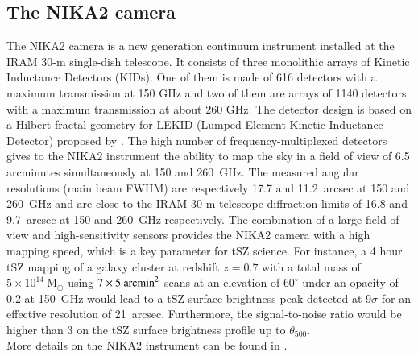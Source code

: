 \documentclass[traditabstract]{aa}
\begin{document}
\subsection{The NIKA2 camera}
The NIKA2 camera is a new generation continuum instrument installed at the IRAM 30-m single-dish telescope. It consists of three monolithic arrays of Kinetic Inductance Detectors (KIDs). One of them is made of 616 detectors with a maximum transmission at 150 GHz and two of them are arrays of 1140 detectors with a maximum transmission at about 260 GHz. The detector design is based on a Hilbert fractal geometry for LEKID (Lumped Element Kinetic Inductance Detector) proposed by \citep{roe12}. The high number of frequency-multiplexed detectors gives to the NIKA2 instrument the ability to map the sky in a field of view of 6.5 arcminutes simultaneously at 150 and 260~GHz. The measured angular resolutions (main beam FWHM) are respectively 17.7 and 11.2~arcsec at 150 and 260~GHz and are close to the IRAM 30-m telescope diffraction limits of 16.8 and 9.7~arcsec at 150 and 260~GHz respectively. 
The combination of a large field of view and high-sensitivity sensors provides the NIKA2 camera with a high mapping speed, which is a key parameter for tSZ science. For instance, a 4 hour tSZ mapping of a galaxy cluster at redshift $z = 0.7$ with a total mass of $5 \times 10^{14}~\mathrm{M_{\odot}}$ using $7\times 5~\rm{arcmin}^2$ scans at an elevation of $60^{\circ}$ under an opacity of 0.2 at 150~GHz would lead to a tSZ surface brightness peak detected at 9$\sigma$ for an effective resolution of 21~arcsec. Furthermore, the signal-to-noise ratio would be higher than 3 on the tSZ surface brightness profile up to $\theta_{500}$.\\
\indent More details on the NIKA2 instrument can be found in \citep{ada17a, cal16, bou16}.
\end{document}
